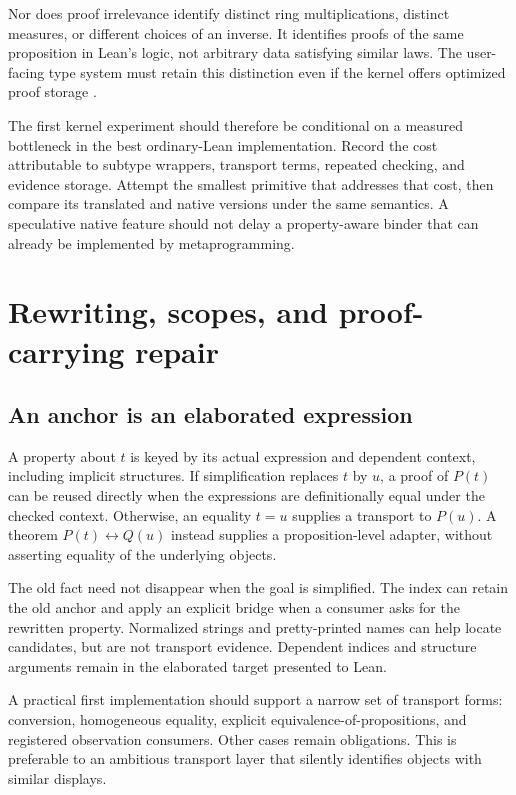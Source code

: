 \documentclass[11pt,a4paper]{article}
\theoremstyle{definition}\newtheorem{definition}[theorem]{Definition}
\theoremstyle{remark}\newtheorem{remark}[theorem]{Remark}
\begin{document}
Nor does proof irrelevance identify distinct ring multiplications, distinct measures, or different choices of an inverse. It identifies proofs of the same proposition in Lean's logic, not arbitrary data satisfying similar laws. The user-facing type system must retain this distinction even if the kernel offers optimized proof storage \cite{leantypes,leanaxioms}.

The first kernel experiment should therefore be conditional on a measured bottleneck in the best ordinary-Lean implementation. Record the cost attributable to subtype wrappers, transport terms, repeated checking, and evidence storage. Attempt the smallest primitive that addresses that cost, then compare its translated and native versions under the same semantics. A speculative native feature should not delay a property-aware binder that can already be implemented by metaprogramming.

\section{Rewriting, scopes, and proof-carrying repair}\label{sec:repair}

\subsection{An anchor is an elaborated expression}
A property about $t$ is keyed by its actual expression and dependent context, including implicit structures. If simplification replaces $t$ by $u$, a proof of $P(t)$ can be reused directly when the expressions are definitionally equal under the checked context. Otherwise, an equality $t=u$ supplies a transport to $P(u)$. A theorem $P(t)\leftrightarrow Q(u)$ instead supplies a proposition-level adapter, without asserting equality of the underlying objects.

The old fact need not disappear when the goal is simplified. The index can retain the old anchor and apply an explicit bridge when a consumer asks for the rewritten property. Normalized strings and pretty-printed names can help locate candidates, but are not transport evidence. Dependent indices and structure arguments remain in the elaborated target presented to Lean.

A practical first implementation should support a narrow set of transport forms: conversion, homogeneous equality, explicit equivalence-of-propositions, and registered observation consumers. Other cases remain obligations. This is preferable to an ambitious transport layer that silently identifies objects with similar displays.
\end{document}
